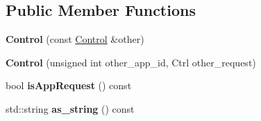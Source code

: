 \subsection*{Public Member Functions}
\begin{DoxyCompactItemize}
\item 
{\bfseries Control} (const \hyperlink{structudp_1_1Control}{Control} \&other)\hypertarget{structudp_1_1Control_a80ead121f346f13f0541ebc2b8d5e85c}{}\label{structudp_1_1Control_a80ead121f346f13f0541ebc2b8d5e85c}

\item 
{\bfseries Control} (unsigned int other\+\_\+app\+\_\+id, Ctrl other\+\_\+request)\hypertarget{structudp_1_1Control_a52fc45d985e82b72f2866315400db2a7}{}\label{structudp_1_1Control_a52fc45d985e82b72f2866315400db2a7}

\item 
bool {\bfseries is\+App\+Request} () const \hypertarget{structudp_1_1Control_aca09c51711169fbe9631531e80d3c8b6}{}\label{structudp_1_1Control_aca09c51711169fbe9631531e80d3c8b6}

\item 
std\+::string {\bfseries as\+\_\+string} () const \hypertarget{structudp_1_1Control_ad1fcb10d98b4f729bdf6bd54949940d4}{}\label{structudp_1_1Control_ad1fcb10d98b4f729bdf6bd54949940d4}

\end{DoxyCompactItemize}
